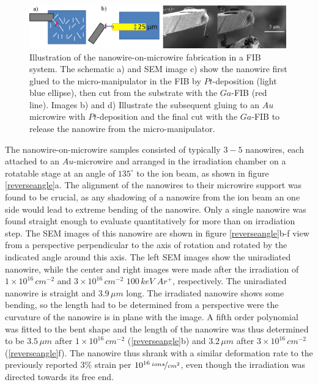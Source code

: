 \begin{figure}[thbp]
	\centering
		\includegraphics[width=0.99\textwidth]{images/reverseFIB.jpg}
	\caption{Illustration of the nanowire-on-microwire fabrication in a FIB system. The schematic a) and SEM image c) show the nanowire first glued to the micro-manipulator in the FIB by $Pt$-deposition (light blue ellipse), then cut from the substrate with the $Ga$-FIB (red line). Images b) and d) Illustrate the subsequent gluing to an $Au$ microwire with $Pt$-deposition and the final cut with the $Ga$-FIB to release the nanowire from the micro-manipulator.}
	\label{reverseFIB}
\end{figure}

The nanowire-on-microwire samples consisted of typically $3-5$ nanowires, each attached to an $Au$-microwire and arranged in the irradiation chamber on a rotatable stage at an angle of $135^\circ$ to the ion beam, as shown in figure \ref{reverseangle}a. The alignment of the nanowires to their microwire support was found to be crucial, as any shadowing of a nanowire from the ion beam an one side would lead to extreme bending of the nanowire. Only a single nanowire was found straight enough to evaluate quantitatively for more than on irradiation step. The SEM images of this nanowire are shown in figure \ref{reverseangle}b-f view from a perspective perpendicular to the axis of rotation and rotated by the indicated angle around this axis. The left SEM images show the uniradiated nanowire, while the center and right images were made after the irradiation of $1\times10^{16}\,cm^{-2}$ and $3\times10^{16}\,cm^{-2}$ $100\,keV\,\,Ar^+$, respectively. The uniradiated nanowire is straight and $3.9\,\mu m$ long. The irradiated nanowire shows some bending, so the length had to be determined from a perspective were the curvature of the nanowire is in plane with the image. A fifth order polynomial was fitted to the bent shape and the length of the nanowire was thus determined to be $3.5\,\mu m$ after $1\times10^{16}\,cm^{-2}$ (\ref{reverseangle}b) and $3.2\,\mu m$ after $3\times10^{16}\,cm^{-2}$ (\ref{reverseangle}f). The nanowire thus shrank with a similar deformation rate to the previously reported $3\%$ strain per $10^{16}\,\nicefrac{ions}{cm^2}$, even though the irradiation was directed towards its free end.

